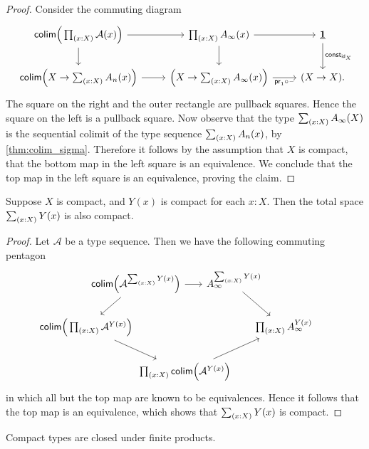 \begin{proof}
Consider the commuting diagram
\begin{equation*}
\begin{tikzcd}
\mathsf{colim}\Big(\prd{x:X}\mathcal{A}(x)\Big) \arrow[d] \arrow[r] & \prd{x:X}A_\infty(x) \arrow[d] \arrow[r] & \unit \arrow[d,"\mathsf{const}_{\idfunc[X]}"] \\
\mathsf{colim}\Big(X\to\sm{x:X}A_n(x)\Big) \arrow[r] & \Big(X\to \sm{x:X}A_\infty(x)\Big) \arrow[r,swap,"\proj 1\circ\blank"] & (X\to X).
\end{tikzcd}
\end{equation*}
The square on the right and the outer rectangle are pullback squares. Hence the square on the left is a pullback square. Now observe that the type $\sm{x:X}A_\infty(X)$ is the sequential colimit of the type sequence $\sm{x:X}A_n(x)$, by \cref{thm:colim_sigma}. Therefore it follows by the assumption that $X$ is compact, that the bottom map in the left square is an equivalence. We conclude that the top map in the left square is an equivalence, proving the claim.
\end{proof}

\begin{cor}
Suppose $X$ is compact, and $Y(x)$ is compact for each $x:X$. Then the total space $\sm{x:X}Y(x)$ is also compact.
\end{cor}

\begin{proof}
Let $\mathcal{A}$ be a type sequence. Then we have the following commuting pentagon
\begin{equation*}
\begin{tikzcd}[column sep=-5em]
& \mathsf{colim}\Big(\mathcal{A}^{\sm{x:X}Y(x)}\Big) \arrow[rr] \arrow[dl] & & A_\infty^{\sm{x:X}Y(x)} \arrow[dr] \\
\mathsf{colim}\Big(\prd{x:X}\mathcal{A}^{Y(x)}\Big) \arrow[drr] & & & & \prd{x:X} A_\infty^{Y(x)} \\
& & \prd{x:X}\mathsf{colim}\Big(\mathcal{A}^{Y(x)}\Big) \arrow[urr] & \phantom{\mathsf{colim}\Big(\mathcal{A}^{\sm{x:X}Y(x)}\Big)} & \phantom{\mathsf{colim}\Big(\prd{x:X}\mathcal{A}^{Y(x)}\Big)}
\end{tikzcd}
\end{equation*}
in which all but the top map are known to be equivalences. Hence it follows that the top map is an equivalence, which shows that $\sm{x:X}Y(x)$ is compact.
\end{proof}

\begin{cor}
Compact types are closed under finite products.
\end{cor}

